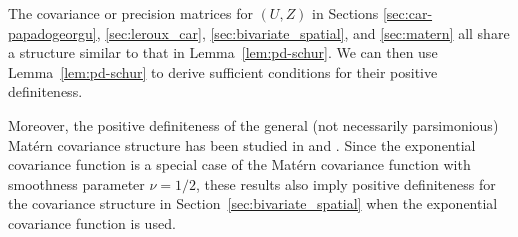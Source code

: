 \documentclass[11pt]{article}
\theoremstyle{definition}
\theoremstyle{remark}
\begin{document}
The covariance or precision matrices for $(U,Z)$ in Sections 
\ref{sec:car-papadogeorgu}, \ref{sec:leroux_car}, 
\ref{sec:bivariate_spatial}, and \ref{sec:matern} 
all share a structure similar to that in Lemma~\ref{lem:pd-schur}. 
We can then use Lemma~\ref{lem:pd-schur} to derive sufficient conditions for their positive definiteness.

Moreover, the positive definiteness of the general (not necessarily parsimonious) 
Mat\'ern covariance structure has been studied in 
\citet{gneiting2010matern} and \citet{onnen2021estimation}. 
Since the exponential covariance function is a special case of the 
Mat\'ern covariance function with smoothness parameter $\nu = 1/2$, 
these results also imply positive definiteness for the covariance structure in 
Section~\ref{sec:bivariate_spatial} when the exponential covariance 
function is used.



\end{document}
